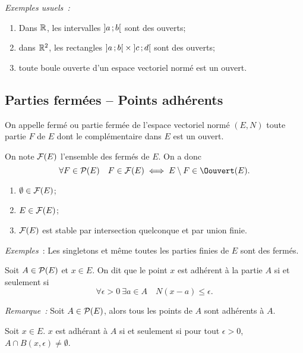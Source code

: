 \emph{Exemples usuels~:}
\begin{enumerate}
\item Dans $\R$, les intervalles $\intervalleoo{a}{b}$ sont des ouverts;
\item dans $\R^2$, les rectangles $\intervalleoo{a}{b}\times\intervalleoo{c}{d}$ sont des ouverts;
\item toute boule ouverte d'un espace vectoriel normé est un ouvert.
\end{enumerate}

\subsection{Parties fermées -- Points adhérents}

\begin{defdef}
  On appelle fermé ou partie fermée de l'espace vectoriel normé $(E, N)$ toute partie $F$ de $E$ dont le complémentaire dans $E$ est un ouvert.

  On note $\F(E)$ l'ensemble des fermés de $E$. On a donc
  \begin{equation}
    \forall F \in \P(E) \quad F \in \F(E) \iff E\setminus F \in \Oouvert(E).
  \end{equation}
\end{defdef}
\begin{prop}
  \begin{enumerate}
  \item $\emptyset \in \F(E)$;
  \item $E \in \F(E)$;
  \item $\F(E)$ est stable par intersection quelconque et par union finie.
  \end{enumerate}
\end{prop}
%
\emph{Exemples}~: Les singletons et même toutes les parties finies de $E$ sont des fermés.
%
\begin{defdef}
  Soit $A \in \P(E)$ et $x \in E$. On dit que le point $x$ est adhérent à la partie $A$ si et seulement si
  \begin{equation}
    \forall \epsilon>0 \ \exists a \in A \quad N(x-a) \leq \epsilon.
  \end{equation}
\end{defdef}
\emph{Remarque~:} Soit $A \in \P(E)$, alors tous les points de $A$ sont adhérents à $A$.
\begin{defdef}
  Soit $x \in E$. $x$ est adhérant à $A$ si et seulement si pour tout $\epsilon>0$, $A \cap B(x, \epsilon) \neq \emptyset$.
\end{defdef}

